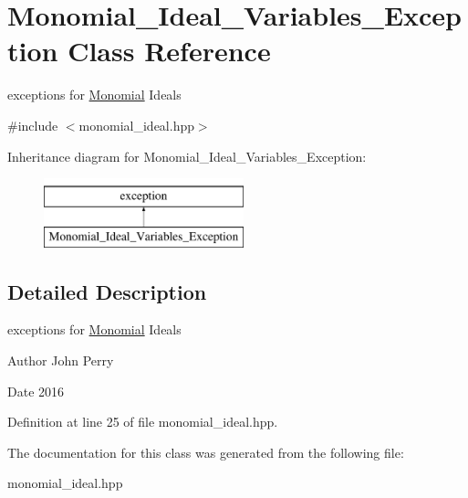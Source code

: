 \hypertarget{class_monomial___ideal___variables___exception}{}\section{Monomial\+\_\+\+Ideal\+\_\+\+Variables\+\_\+\+Exception Class Reference}
\label{class_monomial___ideal___variables___exception}


exceptions for \hyperlink{class_monomial}{Monomial} Ideals  




{\ttfamily \#include $<$monomial\+\_\+ideal.\+hpp$>$}

Inheritance diagram for Monomial\+\_\+\+Ideal\+\_\+\+Variables\+\_\+\+Exception\+:\begin{figure}[H]
\begin{center}
\leavevmode
\includegraphics[height=2.000000cm]{class_monomial___ideal___variables___exception}
\end{center}
\end{figure}


\subsection{Detailed Description}
exceptions for \hyperlink{class_monomial}{Monomial} Ideals 

\begin{DoxyAuthor}{Author}
John Perry 
\end{DoxyAuthor}
\begin{DoxyDate}{Date}
2016 
\end{DoxyDate}


Definition at line 25 of file monomial\+\_\+ideal.\+hpp.



The documentation for this class was generated from the following file\+:\begin{DoxyCompactItemize}
\item 
monomial\+\_\+ideal.\+hpp\end{DoxyCompactItemize}
